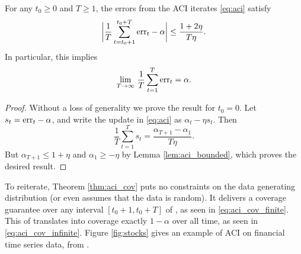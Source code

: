 \documentclass{article}
\begin{document}
\begin{theorem}
\label{thm:aci_cov}
For any $t_0 \geq 0$ and $T \geq 1$, the errors from the ACI iterates
\eqref{eq:aci} satisfy     
\begin{equation}
\label{eq:aci_cov_finite}
\bigg| \frac{1}{T} \sum_{t=t_0+1}^{t_0+T} \mathrm{err}_t - \alpha \bigg| \leq \frac{1 +
  2\eta}{T \eta}. 
\end{equation}
In particular, this implies
\begin{equation}
\label{eq:aci_cov_infinite}
\lim_{T \to \infty} \, \frac{1}{T} \sum_{t=1}^T \mathrm{err}_t = \alpha. 
\end{equation}
\end{theorem}

\begin{proof}
Without a loss of generality we prove the result for $t_0=0$. Let $s_t = \mathrm{err}_t
- \alpha$, and write the update in \eqref{eq:aci} as $\alpha_t - \eta s_t$. Then  
\[
\frac{1}{T} \sum_{t=1}^T s_t = \frac{\alpha_{T+1} - \alpha_1}{T \eta}.  
\]
But $\alpha_{T+1} \leq 1+\eta$ and $\alpha_1 \geq -\eta$ by Lemma
\ref{lem:aci_bounded}, which proves the desired result.
\end{proof}

To reiterate, Theorem \ref{thm:aci_cov} puts no constraints on the data
generating distribution (or even assumes that the data is random). It delivers a
coverage guarantee over any interval $[t_0+1, t_0+T]$ of , as seen in \eqref{eq:aci_cov_finite}. This of
translates into coverage exactly $1-\alpha$ over all time, as seen in
\eqref{eq:aci_cov_infinite}. Figure \ref{fig:stocks} gives an example of ACI on
financial time series data, from \citet{gibbs2021adaptive}.  
\end{document}
